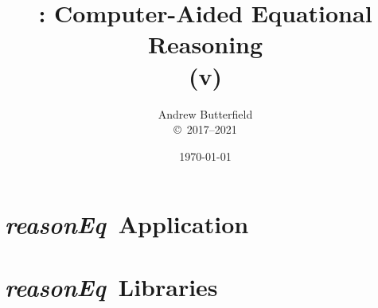 \documentclass[fleqn,10pt]{report}
\author{
Andrew Butterfield
\\
{\small \copyright\ 2017--2021}
}
\title{
  \reasonEq: Computer-Aided Equational Reasoning
  \\(v\reqVersion)
}
\date{
\today
}
\def\reasonEq{\textit{\textsf{reasonEq}}}
\begin{document}
\maketitle
\tableofcontents

\chapter{\reasonEq\ Application}



\chapter{\reasonEq\ Libraries}


\newpage
\newpage
\newpage
\newpage

%
%
%
%
%

\end{document}
